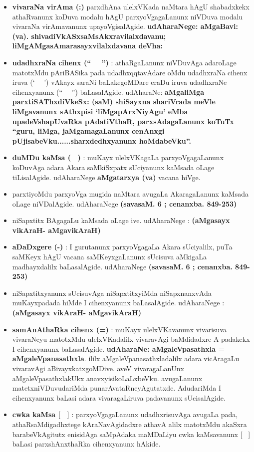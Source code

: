 \begin{itemize}
\item {\bf vivaraNa virAma (:)} parxdhAna ulelxVKada naMtara hAgU shabadxkekx athaRvanunx koDuva modalu hAgU parxyoVgagaLanunx niVDuva modalu vivaraNa virAmavanunx upayoVgisalAgide. \textbf{udAharaNege: aMgaBavi: (va). shivadiVkASxsaMsAkxravilalxdavanu; liMgAMgasAmarasayxvilalxdavana deVha:}

\item {\bf udadhxraNa cihenx (`` \ \ '')} : athaRgaLanunx niVDuvAga adaroLage matotxMdu pAriBASika pada udadhxqqtavAdare oMdu udadhxraNa cihenx iruva (` \ \ ') vAkayx saraNi baLakegoMDare eraDu iruva udadhxraNe cihenxyanunx (`` \ \  '') baLasalAgide. udA\-haraNe: \textbf{aMgaliMga parxtiSAThxdiVkeSx: (saM) shiSayxna shariVrada meVle liMgavanunx sAthxpisi `liMgapArxNiyAgu' eMba upadeVshapUvaRka pAdatiVthaR, parxsAdagaLanunx koTuTx ``guru, liMga, jaMgamagaLanunx cenAnxgi pUjisabeVku......sharxdedhxyanunx hoMdabeVku''.}

\item {\bf duMDu kaMsa ( \  )} : muKayx ulelxVKagaLa parxyoVgagaLanunx koDuvAga adara Akara saMkiSxpatx sUciyanunx kaMsada oLage tiLisalAgide. udAharaNege \textbf{aMgatarxya (va)} vacana hiVge.
\item parxtiyoMdu parxyoVga mugida naMtara avugaLa AkaragaLanunx kaMsada oLage niVDalAgide. udAharaNege \textbf{(savasaM. 6 ; cenanxba. 849-253)}
\item niSapxtitx BAgagaLu kaMsada oLage ive. udAharaNege : \textbf{(aMgasayx vikAraH- aMgavikAraH)}

\item {\bf aDaDxgere (-)} : I gurutanunx parxyoVgagaLa Akara sUciyalilx, puTa saMKeyx hAgU vacana saMKeyxgaLanunx sUcisuva aMkigaLa madhayxdalilx baLasalAgide. udAharaNege \textbf{(savasaM. 6 ; cenanxba. 849-253)}
\item niSapxtitxyanunx sUcisuvAga niSapxtitxyiMda niSapxnanxvAda muKayxpadada hiMde I cihenxyanunx baLasalAgide. udAharaNege : \textbf{(aMgasayx vikAraH- aMgavikAraH)}

\item {\bf samAnAthaRka cihenx (=)} : muKayx ulelxVKavanunx vivarisuva vivaraNeyu matotxMdu ulelxVKadalilx vivaravAgi baMdidadxre A padakekx I cihenxyanunx baLasalAgide. \textbf{udAharaNe: aMgaleVpasathxla = aMgaleVpanasathxla}. ililx aMgaleVpanasathxladalilx adara vicAragaLu vivaravAgi aBivayxkatxgoMDive. aveV vivaragaLanUnx aMgaleVpasathxlakUkx anavxyisikoLaLxbeVku. avugaLanunx matetx\break niVDuvudariMda punarAvataRneyAgutatxde. AdudariMda I cihenxyanunx baLasi adara vivaragaLiruva padavanunx sUcisalAgide.

\item {\bf cwka kaMsa [ \ ]} : parxyoVgagaLanunx udadhxrisuvAga avugaLa pada, athaRsaMdigadhxtege kAraNavAgidadxre athavA alilx matotxMdu akaSxra bara\-beVkAgitutx enisidAga saMpAdaka maMDaLiyu cwka kaMsavanunx [ \ ] baLasi parxshAnxthaRka cihenxyanunx hAkide.
\end{itemize}

